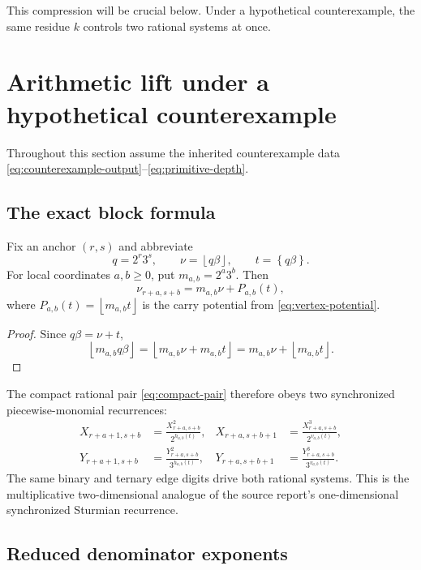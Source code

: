\documentclass[11pt]{article}
\theoremstyle{definition}
\theoremstyle{remark}
\newcommand{\fract}[1]{\left\{#1\right\}}
\newcommand{\floor}[1]{\left\lfloor#1\right\rfloor}
\begin{document}
This compression will be crucial below.  Under a hypothetical counterexample, the
same residue $k$ controls two rational systems at once.

\section{Arithmetic lift under a hypothetical counterexample}
\label{sec:counterexample-lift}

Throughout this section assume the inherited counterexample data
\eqref{eq:counterexample-output}--\eqref{eq:primitive-depth}.

\subsection{The exact block formula}

Fix an anchor $(r,s)$ and abbreviate
\begin{equation}\label{eq:anchor-abbrev}
 q=2^r3^s,
 \qquad
 \nu=\floor{q\beta},
 \qquad
 t=\fract{q\beta}.
\end{equation}
For local coordinates $a,b\ge0$, put $m_{a,b}=2^a3^b$.  Then
\begin{equation}\label{eq:block-floor-formula}
 \nu_{r+a,s+b}=m_{a,b}\nu+P_{a,b}(t),
\end{equation}
where $P_{a,b}(t)=\floor{m_{a,b}t}$ is the carry potential from
\eqref{eq:vertex-potential}.

\begin{proof}
Since $q\beta=\nu+t$,
\[
 \floor{m_{a,b}q\beta}
 =\floor{m_{a,b}\nu+m_{a,b}t}
 =m_{a,b}\nu+\floor{m_{a,b}t}.
\]
\end{proof}

The compact rational pair \eqref{eq:compact-pair} therefore obeys two synchronized
piecewise-monomial recurrences:
\begin{align}
 X_{r+a+1,s+b}
 &=\frac{X_{r+a,s+b}^{2}}{2^{h_{a,b}(t)}},
 &
 X_{r+a,s+b+1}
 &=\frac{X_{r+a,s+b}^{3}}{2^{v_{a,b}(t)}},
 \label{eq:X-recurrence}\\
 Y_{r+a+1,s+b}
 &=\frac{Y_{r+a,s+b}^{2}}{3^{h_{a,b}(t)}},
 &
 Y_{r+a,s+b+1}
 &=\frac{Y_{r+a,s+b}^{3}}{3^{v_{a,b}(t)}}.
 \label{eq:Y-recurrence}
\end{align}
The same binary and ternary edge digits drive both rational systems.  This is the
multiplicative two-dimensional analogue of the source report's one-dimensional
synchronized Sturmian recurrence.

\subsection{Reduced denominator exponents}
\end{document}
